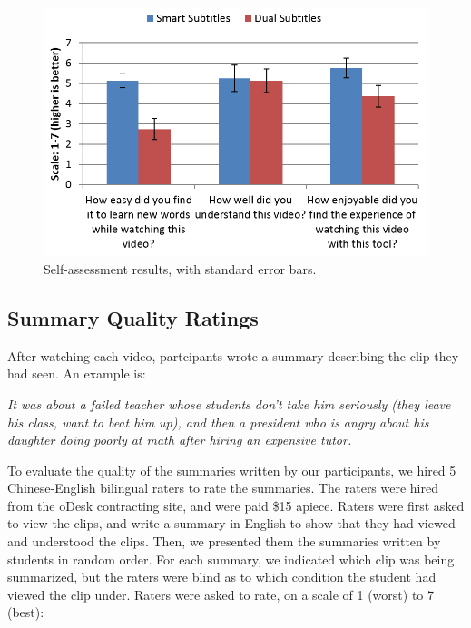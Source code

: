 \documentclass{sigchi}
\begin{document}
\begin{figure}[!h]
\centering
\includegraphics[width=\columnwidth]{self-assessment-results}
\caption{Self-assessment results, with standard error bars.}
\label{fig:figure8}
\end{figure}

\subsection{Summary Quality Ratings}

After watching each video, partcipants wrote a summary describing the clip they had seen. An example is:

\emph{It was about a failed teacher whose students don't take him seriously (they leave his class, want to beat him up), and then a president who is angry about his daughter doing poorly at math after hiring an expensive tutor.}

To evaluate the quality of the summaries written by our participants, we hired 5 Chinese-English bilingual raters to rate the summaries. The raters were hired from the oDesk contracting site, and were paid \$15 apiece. Raters were
first asked to view the clips, and write a summary in English to show that they had viewed and understood the clips.
Then, we presented them the summaries
written by students in random order. For each summary, we indicated which clip was being summarized, but the raters were blind as to which condition the student had viewed the clip under. Raters were asked to rate, on a scale of 1 (worst) to 7 (best):
\end{document}
